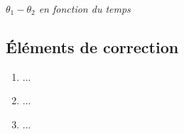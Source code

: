 \documentclass[10pt,fleqn]{article} %
\begin{document}
\begin{multicols}{2}
\begin{center}
\textit{$\theta_1-\theta_2$ en
fonction du temps \label{fig20}}
\end{center}


\subsection*{Éléments de correction}
\begin{enumerate}
\item ...
\item ...
\item ...
\end{enumerate}
\end{multicols}

%
\end{document}
